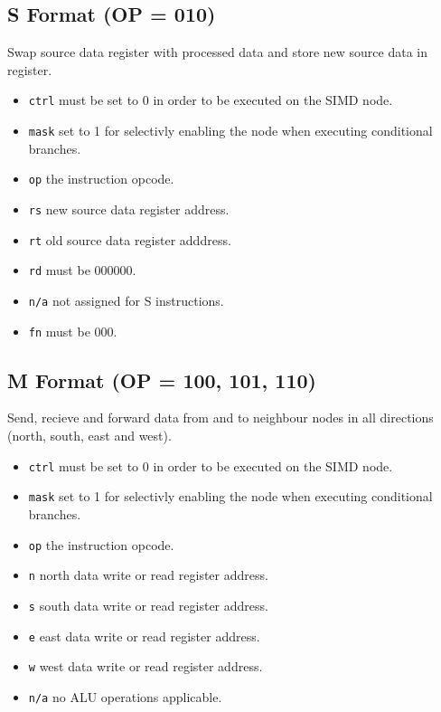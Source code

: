 

\subsection[S Format]{S Format (OP = 010)}
Swap source data register with processed data and store new source data in
register.



\begin{itemize}
\item {\tt ctrl} must be set to 0 in order to be executed on the SIMD node.
\item {\tt mask} set to 1 for selectivly enabling the node when executing
  conditional branches.
\item {\tt op} the instruction opcode.
\item {\tt rs} new source data register address.
\item {\tt rt} old source data register adddress.
\item {\tt rd} must be 000000.
\item {\tt n/a} not assigned for S instructions.
\item {\tt fn} must be 000.
\end{itemize}



\subsection[M Format]{M Format (OP = 100, 101, 110)}
Send, recieve and forward data from and to neighbour nodes in all directions
(north, south, east and west).



\begin{itemize}
\item {\tt ctrl} must be set to 0 in order to be executed on the SIMD node.
\item {\tt mask} set to 1 for selectivly enabling the node when executing
  conditional branches.
\item {\tt op} the instruction opcode.
\item {\tt n} north data write or read register address.
\item {\tt s} south data write or read register address.
\item {\tt e} east data write or read register address.
\item {\tt w} west data write or read register address.
\item {\tt n/a} no ALU operations applicable.
\end{itemize}

